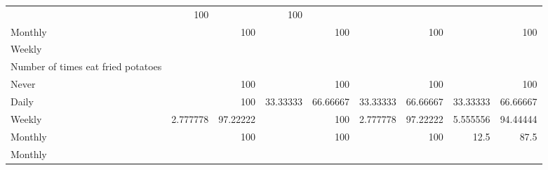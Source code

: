 \documentclass{article}
\begin{document}
\begin{tabular}{lllllllll}
  \multicolumn{1}{r}{} &
  \multicolumn{1}{r}{100} &
  \multicolumn{1}{r}{} &
  \multicolumn{1}{r}{100} \\
\multicolumn{1}{l}{\hspace{7em}Monthly} &
  \multicolumn{1}{|r}{} &
  \multicolumn{1}{r}{100} &
  \multicolumn{1}{r}{} &
  \multicolumn{1}{r}{100} &
  \multicolumn{1}{r}{} &
  \multicolumn{1}{r}{100} &
  \multicolumn{1}{r}{} &
  \multicolumn{1}{r}{100} \\
\multicolumn{1}{l}{\hspace{5em}Weekly} &
  \multicolumn{1}{|r}{} &
  \multicolumn{1}{r}{} &
  \multicolumn{1}{r}{} &
  \multicolumn{1}{r}{} &
  \multicolumn{1}{r}{} &
  \multicolumn{1}{r}{} &
  \multicolumn{1}{r}{} &
  \multicolumn{1}{r}{} \\
\multicolumn{1}{l}{\hspace{6em}Number of times eat fried potatoes} &
  \multicolumn{1}{|r}{} &
  \multicolumn{1}{r}{} &
  \multicolumn{1}{r}{} &
  \multicolumn{1}{r}{} &
  \multicolumn{1}{r}{} &
  \multicolumn{1}{r}{} &
  \multicolumn{1}{r}{} &
  \multicolumn{1}{r}{} \\
\multicolumn{1}{l}{\hspace{7em}Never} &
  \multicolumn{1}{|r}{} &
  \multicolumn{1}{r}{100} &
  \multicolumn{1}{r}{} &
  \multicolumn{1}{r}{100} &
  \multicolumn{1}{r}{} &
  \multicolumn{1}{r}{100} &
  \multicolumn{1}{r}{} &
  \multicolumn{1}{r}{100} \\
\multicolumn{1}{l}{\hspace{7em}Daily} &
  \multicolumn{1}{|r}{} &
  \multicolumn{1}{r}{100} &
  \multicolumn{1}{r}{33.33333} &
  \multicolumn{1}{r}{66.66667} &
  \multicolumn{1}{r}{33.33333} &
  \multicolumn{1}{r}{66.66667} &
  \multicolumn{1}{r}{33.33333} &
  \multicolumn{1}{r}{66.66667} \\
\multicolumn{1}{l}{\hspace{7em}Weekly} &
  \multicolumn{1}{|r}{2.777778} &
  \multicolumn{1}{r}{97.22222} &
  \multicolumn{1}{r}{} &
  \multicolumn{1}{r}{100} &
  \multicolumn{1}{r}{2.777778} &
  \multicolumn{1}{r}{97.22222} &
  \multicolumn{1}{r}{5.555556} &
  \multicolumn{1}{r}{94.44444} \\
\multicolumn{1}{l}{\hspace{7em}Monthly} &
  \multicolumn{1}{|r}{} &
  \multicolumn{1}{r}{100} &
  \multicolumn{1}{r}{} &
  \multicolumn{1}{r}{100} &
  \multicolumn{1}{r}{} &
  \multicolumn{1}{r}{100} &
  \multicolumn{1}{r}{12.5} &
  \multicolumn{1}{r}{87.5} \\
\multicolumn{1}{l}{\hspace{5em}Monthly} &

\end{tabular}
\end{document}
